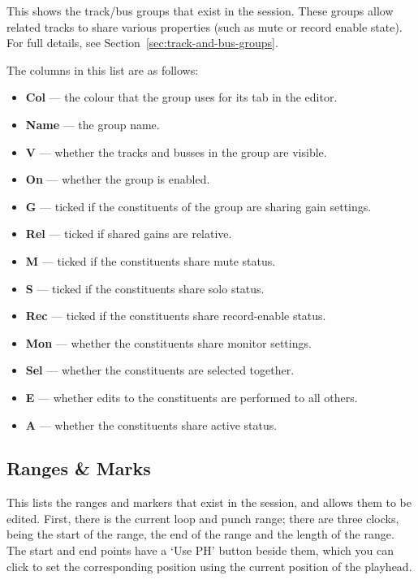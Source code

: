 \documentclass[10pt,a4paper]{book}
\begin{document}
This shows the track/bus groups that exist in the session.  These
groups allow related tracks to share various properties (such as mute
or record enable state).  For full details, see
Section~\ref{sec:track-and-bus-groups}.

The columns in this list are as follows:

\begin{itemize}
\item \textbf{Col} --- the colour that the group uses for its tab in
  the editor.
\item \textbf{Name} --- the group name.
\item \textbf{V} --- whether the tracks and busses in the group are visible.
\item \textbf{On} --- whether the group is enabled.
\item \textbf{G} --- ticked if the constituents of the group are sharing gain settings.
\item \textbf{Rel} --- ticked if shared gains are relative.
\item \textbf{M} --- ticked if the constituents share mute status.
\item \textbf{S} --- ticked if the constituents share solo status.
\item \textbf{Rec} --- ticked if the constituents share record-enable status.
\item \textbf{Mon} --- whether the constituents share monitor settings.
\item \textbf{Sel} --- whether the constituents are selected together.
\item \textbf{E} --- whether edits to the constituents are performed to all others.
\item \textbf{A} --- whether the constituents share active status.
\end{itemize}

\subsection{Ranges \& Marks}

This lists the ranges and markers that exist in the session, and
allows them to be edited.  First, there is the current loop and punch
range; there are three clocks, being the start of the range, the end
of the range and the length of the range.  The start and end points
have a `Use PH' button beside them, which you can click to set the
corresponding position using the current position of the playhead.
\end{document}
